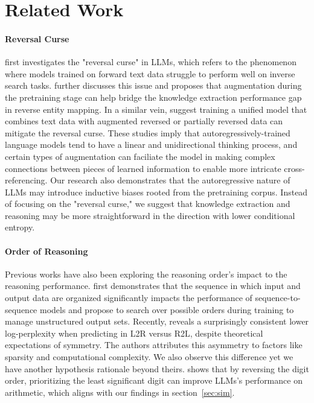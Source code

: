 \section{Related Work}
\paragraph{Reversal Curse} 
\citet{berglund2023reversal} first investigates the "reversal curse" in LLMs, which refers to the phenomenon where models trained on forward text data struggle to perform well on inverse search tasks. \citet{allen2023physics_3_1} further discusses this issue and proposes that augmentation during the pretraining stage can help bridge the knowledge extraction performance gap in reverse entity mapping. In a similar vein, \citet{golovneva2024reverse} suggest training a unified model that combines text data with augmented reversed or partially reversed data can mitigate the reversal curse.
These studies imply that autoregressively-trained language models tend to have a linear and unidirectional thinking process, and certain types of augmentation can faciliate the model in making complex connections between pieces of learned information to enable more intricate cross-referencing. Our research also demonstrates that the autoregressive nature of LLMs may introduce inductive biases rooted from the pretraining corpus. Instead of focusing on the "reversal curse," we suggest that knowledge extraction and reasoning may be more straightforward in the direction with lower conditional entropy.


\paragraph{Order of Reasoning} 
Previous works have also been exploring the reasoning order's impact to the reasoning performance. \citet{vinyals2015order} first demonstrates that the sequence in which input and output data are organized significantly impacts the performance of sequence-to-sequence models and propose to search over possible orders during training to manage unstructured output sets.
Recently, \citet{papadopoulos2024arrows} reveals a surprisingly consistent lower log-perplexity when predicting in L2R versus R2L, despite theoretical expectations of symmetry. The authors attributes this asymmetry to factors like sparsity and computational complexity. We also observe this difference yet we have another hypothesis rationale beyond theirs. 
\citet{zhang2024reverse} shows that by reversing the digit order, prioritizing the least significant digit can improve LLMs's performance on arithmetic, which aligns with our findings in section~\ref{sec:sim}. 



